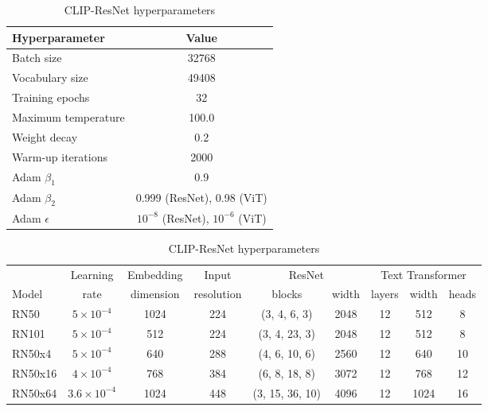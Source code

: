 \documentclass{article}
\begin{document}
\begin{table}[h!]
\begin{minipage}{\textwidth}
\centering

\begin{tabular}{l|c} \toprule
    Hyperparameter  & Value \\ \midrule
    Batch size & 32768 \\
    Vocabulary size & 49408 \\
    Training epochs & 32 \\
    Maximum temperature & 100.0 \\
    Weight decay & 0.2 \\
    Warm-up iterations & 2000 \\
    Adam $\beta_1$ & 0.9 \\
    Adam $\beta_2$ & 0.999 (ResNet), 0.98 (ViT)\\
    Adam $\epsilon$ & $10^{-8}$ (ResNet), $10^{-6}$ (ViT)\\
    \bottomrule
\end{tabular}
\caption{Common CLIP hyperparameters}



\vspace{2em}

\small
\begin{tabular}{l|cccccccc} \toprule
          & Learning & Embedding & Input      & \multicolumn{2}{c}{ResNet}  & \multicolumn{3}{c}{Text Transformer} \\
    Model & rate & dimension & resolution & blocks & width  & layers & width & heads  \\ \midrule
    RN50  & $5 \times 10^{-4}$ & 1024 & 224 & (3, 4, 6, 3) & 2048 & 12 & 512 & 8 \\
    RN101 & $5 \times 10^{-4}$ & 512 & 224 & (3, 4, 23, 3) & 2048 & 12 & 512 & 8 \\
    RN50x4 & $5 \times 10^{-4}$ & 640 & 288 & (4, 6, 10, 6) & 2560 & 12 & 640 & 10 \\
    RN50x16 & $4 \times 10^{-4}$ & 768 & 384 & (6, 8, 18, 8) & 3072 & 12 & 768 & 12 \\
    RN50x64 & $3.6 \times 10^{-4}$ & 1024 & 448 & (3, 15, 36, 10) & 4096 & 12 & 1024 & 16 \\ 
    \bottomrule
\end{tabular}
\caption{CLIP-ResNet hyperparameters}


\vspace{2em}



\end{minipage}
\end{table}
\end{document}
